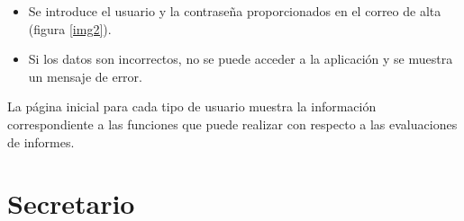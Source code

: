 \documentclass[12pt,a4paper,spanish,twoside]{book}
\begin{document}

\begin{itemize}
\item Se introduce el usuario y la contraseña proporcionados en el correo de 
alta (figura \ref{img2}).


\item Si los datos son incorrectos, no se puede acceder a la aplicación y se
  muestra un mensaje de error. 
\end{itemize}

La página inicial para cada tipo de usuario muestra la información 
correspondiente a las funciones que puede realizar con respecto a las 
evaluaciones de informes.


\section{Secretario}
\end{document}
